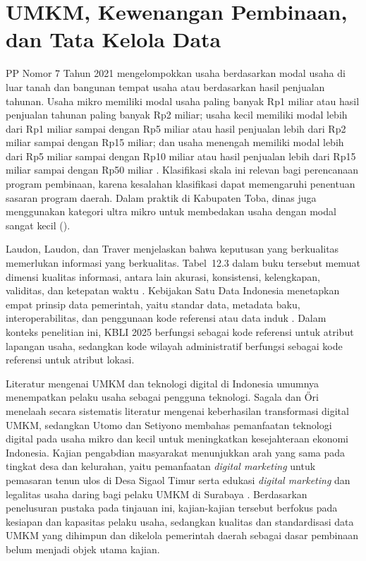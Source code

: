 \section{UMKM, Kewenangan Pembinaan, dan Tata Kelola Data}
\label{sec:umkm}

PP Nomor 7 Tahun 2021 mengelompokkan usaha berdasarkan modal usaha di luar tanah dan bangunan tempat usaha atau berdasarkan hasil penjualan tahunan. Usaha mikro memiliki modal usaha paling banyak Rp1 miliar atau hasil penjualan tahunan paling banyak Rp2 miliar; usaha kecil memiliki modal lebih dari Rp1 miliar sampai dengan Rp5 miliar atau hasil penjualan lebih dari Rp2 miliar sampai dengan Rp15 miliar; dan usaha menengah memiliki modal lebih dari Rp5 miliar sampai dengan Rp10 miliar atau hasil penjualan lebih dari Rp15 miliar sampai dengan Rp50 miliar \cite{pp7tahun2021}. Klasifikasi skala ini relevan bagi perencanaan program pembinaan, karena kesalahan klasifikasi dapat memengaruhi penentuan sasaran program daerah. Dalam praktik di Kabupaten Toba, dinas juga menggunakan kategori ultra mikro untuk membedakan usaha dengan modal sangat kecil (\lampstaf).

Laudon, Laudon, dan Traver menjelaskan bahwa keputusan yang berkualitas memerlukan informasi yang berkualitas. Tabel~12.3 dalam buku tersebut memuat dimensi kualitas informasi, antara lain akurasi, konsistensi, kelengkapan, validitas, dan ketepatan waktu \cite[Tabel~12.3]{laudon2026mis}. Kebijakan Satu Data Indonesia menetapkan empat prinsip data pemerintah, yaitu standar data, metadata baku, interoperabilitas, dan penggunaan kode referensi atau data induk \cite{perpres39tahun2019}. Dalam konteks penelitian ini, KBLI 2025 berfungsi sebagai kode referensi untuk atribut lapangan usaha, sedangkan kode wilayah administratif berfungsi sebagai kode referensi untuk atribut lokasi.

Literatur mengenai UMKM dan teknologi digital di Indonesia umumnya menempatkan pelaku usaha sebagai pengguna teknologi. Sagala dan {\H{O}}ri \cite{sagala2024sme} menelaah secara sistematis literatur mengenai keberhasilan transformasi digital UMKM, sedangkan Utomo dan Setiyono \cite{utomo2024digital} membahas pemanfaatan teknologi digital pada usaha mikro dan kecil untuk meningkatkan kesejahteraan ekonomi Indonesia. Kajian pengabdian masyarakat menunjukkan arah yang sama pada tingkat desa dan kelurahan, yaitu pemanfaatan \textit{digital marketing} untuk pemasaran tenun ulos di Desa Sigaol Timur \cite{naibaho2025ulos} serta edukasi \textit{digital marketing} dan legalitas usaha daring bagi pelaku UMKM di Surabaya \cite{nadhifah2026digitalisasi}. Berdasarkan penelusuran pustaka pada tinjauan ini, kajian-kajian tersebut berfokus pada kesiapan dan kapasitas pelaku usaha, sedangkan kualitas dan standardisasi data UMKM yang dihimpun dan dikelola pemerintah daerah sebagai dasar pembinaan belum menjadi objek utama kajian.

